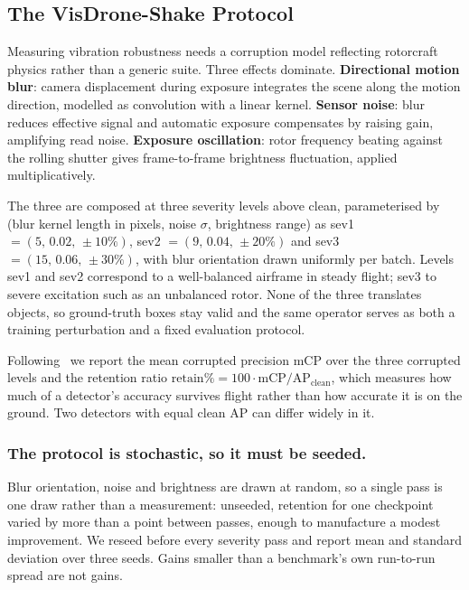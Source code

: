 \subsection{The VisDrone-Shake Protocol}
\label{sec:shake}

Measuring vibration robustness needs a corruption model reflecting rotorcraft
physics rather than a generic suite. Three effects dominate. \textbf{Directional
motion blur}: camera displacement during exposure integrates the scene along the
motion direction, modelled as convolution with a linear kernel. \textbf{Sensor
noise}: blur reduces effective signal and automatic exposure compensates by raising
gain, amplifying read noise. \textbf{Exposure oscillation}: rotor frequency beating
against the rolling shutter gives frame-to-frame brightness fluctuation, applied
multiplicatively.

The three are composed at three severity levels above clean, parameterised by (blur
kernel length in pixels, noise $\sigma$, brightness range) as
sev1 $=(5,\,0.02,\,{\pm}10\%)$, sev2 $=(9,\,0.04,\,{\pm}20\%)$ and
sev3 $=(15,\,0.06,\,{\pm}30\%)$, with blur orientation drawn uniformly per batch.
Levels sev1 and sev2 correspond to a well-balanced airframe in steady flight; sev3 to
severe excitation such as an unbalanced rotor. None of the three translates objects, so
ground-truth boxes stay valid and the same operator serves as both a training
perturbation and a fixed evaluation protocol.

Following~\cite{hendrycks2019benchmarking} we report the mean corrupted precision
$\mathrm{mCP}$ over the three corrupted levels and the retention ratio
$\mathrm{retain}\% = 100 \cdot \mathrm{mCP}/\mathrm{AP}_{\mathrm{clean}}$, which
measures how much of a detector's accuracy survives flight rather than how accurate
it is on the ground. Two detectors with equal clean AP can differ widely in it.

\subsubsection{The protocol is stochastic, so it must be seeded.}
Blur orientation, noise and brightness are drawn at random, so a single pass is one
draw rather than a measurement: unseeded, retention for one checkpoint varied by
more than a point between passes, enough to manufacture a modest improvement. We
reseed before every severity pass and report mean and standard deviation over three
seeds. Gains smaller than a benchmark's own run-to-run spread are not gains.
